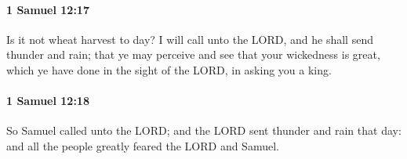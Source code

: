 		\paragraph{1 Samuel 12:17} %
			\label{1SAMUEL-12-17}

			Is it not wheat harvest to day? I will call unto the LORD, and he shall send thunder and rain; that ye may perceive and see that your wickedness is great, which ye have done in the sight of the LORD, in asking you a king.


		\paragraph{1 Samuel 12:18} %
			\label{1SAMUEL-12-18}

			So Samuel called unto the LORD; and the LORD sent thunder and rain that day: and all the people greatly feared the LORD and Samuel.


